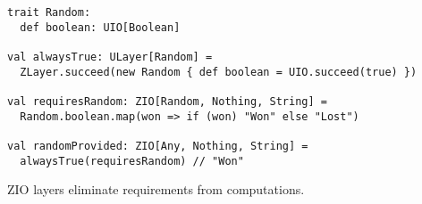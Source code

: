 \begin{algorithm}

\begin{verbatim}
trait Random:
  def boolean: UIO[Boolean]

val alwaysTrue: ULayer[Random] =
  ZLayer.succeed(new Random { def boolean = UIO.succeed(true) })

val requiresRandom: ZIO[Random, Nothing, String] =
  Random.boolean.map(won => if (won) "Won" else "Lost")

val randomProvided: ZIO[Any, Nothing, String] =
  alwaysTrue(requiresRandom) // "Won"

\end{verbatim}

\caption{ZIO layers eliminate requirements from computations. \label{zio:provide-layer}}
\end{algorithm}